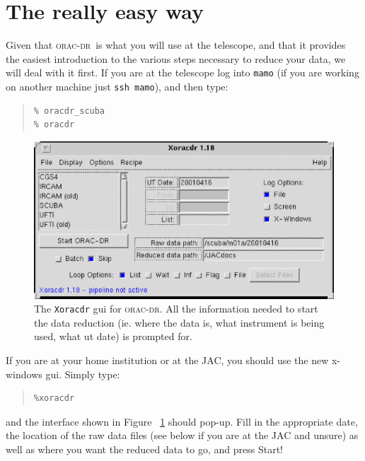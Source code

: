 \documentclass[twoside,11pt]{article}
\newenvironment{myquote}{\begin{quote}\begin{small}}{\end{small}\end{quote}}
\newcommand{\oracdr}{\xref{\textsc{orac-dr}}{sun231}{}}
\newcommand{\xref}[3]{#1}
\newcommand{\xlabel}[1]{}
\renewcommand{\_}{\texttt{\symbol{95}}}
\begin{document}
\section{\xlabel{The really easy way}The really easy way}

Given that \oracdr\ is what you will use at the telescope, and that it
provides the easiest introduction to the various steps necessary to
reduce your data, we will deal with it first. If you are at the
telescope log into \texttt{mamo} (if you are working on another machine just 
\texttt{ssh mamo}), and then type:

\begin{myquote}
\begin{verbatim}
% oracdr_scuba
% oracdr
\end{verbatim}
\end{myquote}

\begin{figure}
\begin{center}
\includegraphics[width=5.5in]{sc11_fig1.eps}
\caption{The \texttt{Xoracdr} gui for \textsc{orac-dr}. 
  All the information needed to start
  the data reduction (ie. where the data is, what instrument is being used,
  what ut date) is prompted for.}
\label{fig:xoracdr}
\end{center}
\end{figure}

If you are at your home institution or at the JAC, you should use the
new x-windows gui. Simply type:

\begin{myquote}
\begin{verbatim}
%xoracdr
\end{verbatim}
\end{myquote}

and the interface shown in Figure \ \ref{fig:xoracdr} should pop-up.
Fill in the appropriate date, the location of the raw data files (see
below if you are at the JAC and unsure) as well as where you want the
reduced data to go, and press Start!
\end{document}
